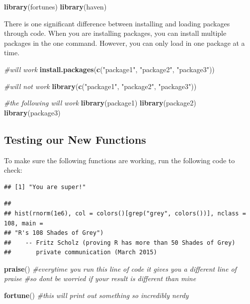 \documentclass[
]{book}
\newenvironment{Shaded}{\begin{snugshade}}{\end{snugshade}}
\newcommand{\CommentTok}[1]{\textcolor[rgb]{0.56,0.35,0.01}{\textit{#1}}}
\newcommand{\FunctionTok}[1]{\textcolor[rgb]{0.13,0.29,0.53}{\textbf{#1}}}
\newcommand{\NormalTok}[1]{#1}
\newcommand{\StringTok}[1]{\textcolor[rgb]{0.31,0.60,0.02}{#1}}
\begin{document}
\begin{Shaded}
\begin{Highlighting}[]
\FunctionTok{library}\NormalTok{(fortunes)}
\FunctionTok{library}\NormalTok{(haven)}
\end{Highlighting}
\end{Shaded}

There is one significant difference between installing and loading packages through code. When you are installing packages, you can install multiple packages in the one command. However, you can only load in one package at a time.

\begin{Shaded}
\begin{Highlighting}[]
\CommentTok{\#will work}
\FunctionTok{install.packages}\NormalTok{(}\FunctionTok{c}\NormalTok{(}\StringTok{"package1"}\NormalTok{, }\StringTok{"package2"}\NormalTok{, }\StringTok{"package3"}\NormalTok{)) }


\CommentTok{\#will not work}
\FunctionTok{library}\NormalTok{(}\FunctionTok{c}\NormalTok{(}\StringTok{"package1"}\NormalTok{, }\StringTok{"package2"}\NormalTok{, }\StringTok{"package3"}\NormalTok{)) }

\CommentTok{\#the following will work}
\FunctionTok{library}\NormalTok{(package1)}
\FunctionTok{library}\NormalTok{(package2)}
\FunctionTok{library}\NormalTok{(package3)}
\end{Highlighting}
\end{Shaded}

\hypertarget{testing-our-new-functions}{%
\subsection{Testing our New Functions}\label{testing-our-new-functions}}

To make sure the following functions are working, run the following code to check:

\begin{verbatim}
## [1] "You are super!"
\end{verbatim}

\begin{verbatim}
## 
## hist(rnorm(1e6), col = colors()[grep("grey", colors())], nclass = 108, main =
## "R's 108 Shades of Grey")
##    -- Fritz Scholz (proving R has more than 50 Shades of Grey)
##       private communication (March 2015)
\end{verbatim}

\begin{Shaded}
\begin{Highlighting}[]
\FunctionTok{praise}\NormalTok{() }\CommentTok{\#everytime you run this line of code it gives you a different line of praise}
\CommentTok{\#so don\textquotesingle{}t be worried if your result is different than mine}

\FunctionTok{fortune}\NormalTok{() }\CommentTok{\#this will print out something so incredibly nerdy }
\end{Highlighting}
\end{Shaded}
\end{document}
